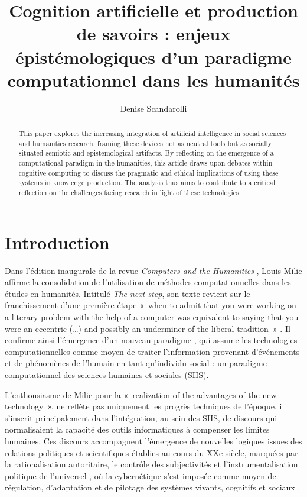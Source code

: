 \documentclass[fra, final]{anthology-ch}
\title{Cognition artificielle et production de savoirs : enjeux épistémologiques d’un paradigme computationnel dans les humanités}
\author[1, 2]{Denise Scandarolli}[
  orcid=0000-0002-5097-2014,
  email=denisescandarolli@gmail.com
]
\affiliation{1}{Université du Québec à Montréal (UQAM), Canada}
\affiliation{2}{Chaire de recherche du Canada en jeu, technologies et société}
\begin{document}
\maketitle

\begin{abstract}
This paper explores the increasing integration of artificial intelligence in social sciences and humanities research, framing these devices not as neutral tools but as socially situated semiotic and epistemological artifacts. By reflecting on the emergence of a computational paradigm in the humanities, this article draws upon debates within cognitive computing to discuss the pragmatic and ethical implications of using these systems in knowledge production. The analysis thus aims to contribute to a critical reflection on the challenges facing research in light of these technologies.
\end{abstract}

\section{Introduction} 

Dans l’édition inaugurale de la revue \textit{Computers and the Humanities} \cite{milic1966}, Louis Milic affirme la consolidation de l’utilisation de méthodes computationnelles dans les études en humanités. Intitulé \textit{The next step}, son texte revient sur le franchissement d’une première étape «~when to admit that you were working on a literary problem with the help of a computer was equivalent to saying that you were an eccentric (…) and possibly an underminer of the liberal tradition~» \cite{milic1966}. Il confirme ainsi l’émergence d’un nouveau paradigme \cite{kuhn1972}, qui assume les technologies computationnelles comme moyen de traiter l’information provenant d’événements et de phénomènes de l’humain en tant qu’individu social : un paradigme computationnel des sciences humaines et sociales (SHS).

L’enthousiasme de Milic \cite{milic1966} pour la «~realization of the advantages of the new technology~», ne reflète pas uniquement les progrès techniques de l’époque, il s’inscrit principalement dans l’intégration, au sein des SHS, de discours qui normalisaient la capacité des outils informatiques à compenser les limites humaines. Ces discours accompagnent l’émergence de nouvelles logiques issues des relations politiques et scientifiques établies au cours du XXe siècle, marquées par la rationalisation autoritaire, le contrôle des subjectivités et l’instrumentalisation politique de l’universel \cite{horkheimer2013, arendt2012}, où la cybernétique s’est imposée comme moyen de régulation, d’adaptation et de pilotage des systèmes vivants, cognitifs et sociaux \cite{bonenfant2020, dupuy1999, wiener2014}.
\end{document}
